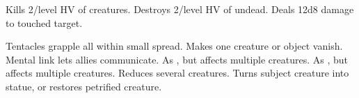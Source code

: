 \begin{swspelllist}
\M Kills 2/level HV of creatures.
\M Destroys 2/level HV of undead.
 Deals 12d8 damage to touched target.
\spellheadrestrictedc{}

 Tentacles grapple all within small spread.
 Makes one creature or object vanish.
 Mental link lets allies communicate.
 As , but affects multiple creatures.
 As , but affects multiple creatures.
 Reduces several creatures.
 Turns subject creature into statue, or restores petrified creature.
\end{swspelllist}

